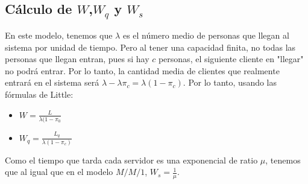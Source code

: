 \begin{itemize}
			\subsection{C\'alculo de $W$,$W_q$ y $W_s$}
			\hspace{0.5cm}En este modelo, tenemos que $\lambda$ es el n\'umero medio de personas que llegan al sistema por unidad de tiempo. Pero al tener una capacidad finita, no todas las personas que llegan entran, pues si hay $c$ personas, el siguiente cliente en "llegar" $~$ no podr\'a entrar. Por lo tanto, la cantidad media de clientes que realmente entrar\'a en el sistema ser\'a $\lambda-\lambda\pi_c=\lambda(1-\pi_c)$. Por lo tanto, usando las f\'ormulas de Little:
			\begin{itemize}
				\item $\displaystyle W=\frac{L}{\lambda(1-\pi_0}$
				\item $\displaystyle W_q=\frac{L_q}{\lambda(1-\pi_c)}$
			\end{itemize}
	\hspace{0.5cm}	Como el tiempo que tarda cada servidor es una exponencial de ratio $\mu$, tenemos que al igual que en el modelo $M/M/1$, $W_s=\frac{1}{\mu}$.
		\end{itemize}
		
